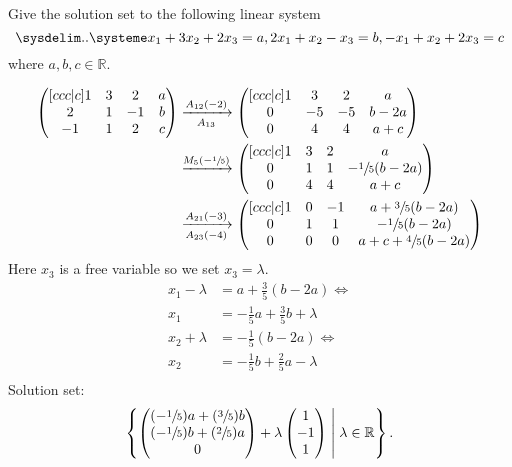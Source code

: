\begin{example}
    Give the solution set to the following linear system 
    \[
        \linsys{
            x_1+3x_2+2x_3=a,
            2x_1+x_2-x_3=b,
            -x_1+x_2+2x_3=c
        }
    \]
    where $a,b,c\in\mathbb R$.
    
    \begin{align*}
        \begin{pmatrix}[ccc|c]
            1&3&2&a\\
            2&1&-1&b\\
            -1&1&2&c\\
        \end{pmatrix}
        &\eroarrow{A_{12}(-2)}{A_{13}}
        \begin{pmatrix}[ccc|c]
            1&3&2&a\\
            0&-5&-5&b-2a\\
            0&4&4&a+c\\
        \end{pmatrix}
        \\
        &\eroarrow{M_5(-\sfrac15)}{}
        \begin{pmatrix}[ccc|c]
            1&3&2&a\\
            0&1&1&-\sfrac15(b-2a)\\
            0&4&4&a+c\\
        \end{pmatrix}
        \\
        &\eroarrow{A_{21}(-3)}{A_{23}(-4)}
        \begin{pmatrix}[ccc|c]
            1&0&-1&a+\sfrac35(b-2a)\\
            0&1&1&-\sfrac15(b-2a)\\
            0&0&0&a+c+\sfrac45(b-2a)\\
        \end{pmatrix}
        \\
    \end{align*}
    Here $x_3$ is a free variable so we set $x_3=\lambda$. 
    \begin{align*}
        x_1-\lambda&=a+\frac35(b-2a)\iff\\
        x_1&=-\frac15a+\frac35b+\lambda\\
        x_2+\lambda&=-\frac15(b-2a)\iff\\
        x_2&=-\frac15b+\frac25a-\lambda\\
    \end{align*}
    Solution set: 
    \[
        \left\{
            \begin{pmatrix}
                (-\sfrac15)a+(\sfrac35)b\\
                (-\sfrac15)b+(\sfrac25)a\\
                0\\
            \end{pmatrix}
            +\lambda
            \begin{pmatrix}
                1\\-1\\1
            \end{pmatrix}
            \;\middle\vert\; \lambda\in\mathbb R
        \right\}
        .
    \]
\end{example}
